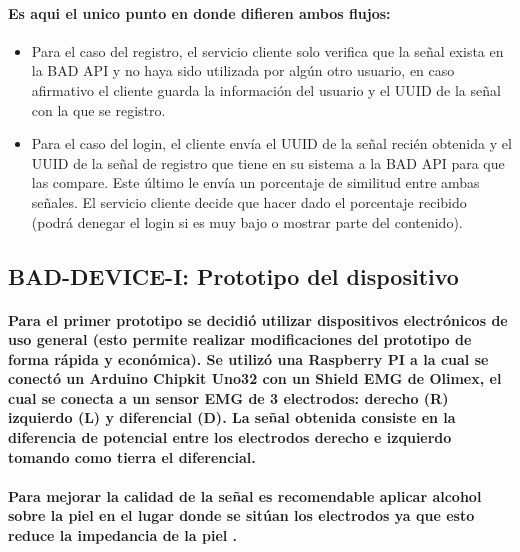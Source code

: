 \documentclass{article}
\begin{document}
\paragraph{
Es aqui el unico punto en donde difieren ambos flujos:
}
\begin{itemize}
    \item Para el caso del registro, el servicio cliente solo verifica que la señal exista en la BAD API y no haya sido utilizada por algún otro usuario, en caso afirmativo el cliente guarda la información del usuario y el UUID de la señal con la que se registro.
    \item Para el caso del login, el cliente envía el UUID de la señal recién obtenida y el UUID de la señal de registro que tiene en su sistema a la BAD API para que las compare. Este último le envía un porcentaje de similitud entre ambas señales. El servicio cliente decide que hacer dado el porcentaje recibido (podrá denegar el login si es muy bajo o mostrar parte del contenido).
\end{itemize}


\subsection{BAD-DEVICE-I: Prototipo del dispositivo}
\paragraph{
Para el primer prototipo se decidió utilizar dispositivos electrónicos de uso general (esto permite realizar modificaciones del prototipo de forma rápida y económica). Se utilizó una Raspberry PI a la cual se conectó un Arduino Chipkit Uno32 con un Shield EMG de Olimex, el cual se conecta a un sensor EMG de 3 electrodos: derecho (R) izquierdo (L) y diferencial (D). La señal obtenida consiste en la diferencia de potencial entre los electrodos derecho e izquierdo tomando como tierra el diferencial.
}
\paragraph{
Para mejorar la calidad de la señal es recomendable aplicar alcohol sobre la piel en el lugar donde se sitúan los electrodos ya que esto reduce la impedancia de la piel
\cite{sanei2007}.}
\end{document}
